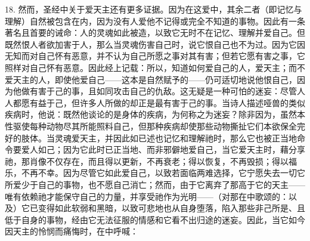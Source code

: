 18. 然而，圣经中关于爱天主还有更多证据。因为在这爱中，其余二者（即记忆与理解）自然被包含在内，因为没有人爱他不记得或完全不知道的事物。因此有一条著名且首要的诫命：人的灵魂如此被造，以致它无时不在记忆、理解并爱自己。但既然恨人者欲加害于人，那么当灵魂伤害自己时，说它恨自己也不为过。因为它因无知而对自己怀有恶意，并不认为自己所愿之事对其有害；但若它愿有害之事，它照样对自己怀有恶意。因此经上记载：所以，知道如何爱自己的人，爱天主；而不爱天主的人，即使他爱自己——这本是自然赋予的——仍可适切地说他恨自己，因为他做有害于己的事，且如同攻击自己的仇敌。这无疑是一种可怕的迷妄：尽管人人都愿有益于己，但许多人所做的却正是最有害于己的事。当诗人描述哑兽的类似疾病时，他说：既然他谈论的是身体的疾病，为何称之为迷妄？除非因为，虽然本性驱使每种动物尽其所能照料自己，但那种疾病却使那些动物撕扯它们本欲保全完好的肢体。当灵魂爱天主，并因此如已述也记忆和理解祂时，那么它也被正当地命令要爱人如己；因为它此时已正当地、而非邪僻地爱自己，当它爱天主时，藉分享祂，那肖像不仅存在，而且得以更新，不再衰老；得以恢复，不再毁损；得以福乐，不再不幸。因为尽管它如此爱自己，以致若面临两难选择，它宁愿失去一切它所爱少于自己的事物，也不愿自己消亡；然而，由于它离弃了那高于它的天主——唯有依赖祂才能保守自己的力量，并享受祂作为光明——（对那在中歌颂的：以及）它已变得如此软弱和黑暗，以致可悲地也从自身堕落，陷入那些非己所是、且低于自身的事物，经由它无法征服的情感和它看不出归途的迷妄。因此，当它如今因天主的怜悯而痛悔时，在中呼喊：\par

